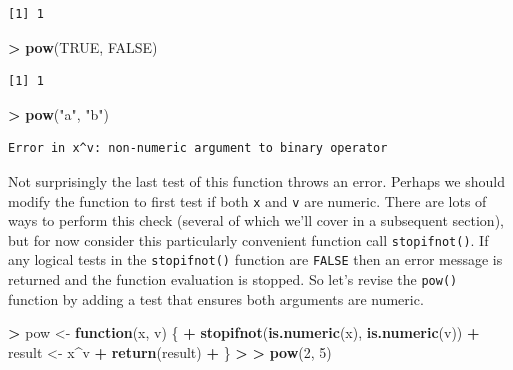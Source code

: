 \documentclass[]{krantz}
\makeatletter
\newenvironment{Shaded}{\begin{snugshade}}{\end{snugshade}}
\newcommand{\ControlFlowTok}[1]{\textcolor[rgb]{0.27,0.27,0.27}{\textbf{#1}}}
\newcommand{\DecValTok}[1]{\textcolor[rgb]{0.06,0.06,0.06}{#1}}
\newcommand{\ErrorTok}[1]{\textcolor[rgb]{0.14,0.14,0.14}{\textbf{#1}}}
\newcommand{\KeywordTok}[1]{\textcolor[rgb]{0.27,0.27,0.27}{\textbf{#1}}}
\newcommand{\NormalTok}[1]{#1}
\newcommand{\OperatorTok}[1]{\textcolor[rgb]{0.43,0.43,0.43}{\textbf{#1}}}
\newcommand{\OtherTok}[1]{\textcolor[rgb]{0.37,0.37,0.37}{#1}}
\newcommand{\StringTok}[1]{\textcolor[rgb]{0.5,0.5,0.5}{#1}}
\newenvironment{kframe}{%
\medskip{}
\setlength{\fboxsep}{.8em}
 \def\at@end@of@kframe{}%
 \ifinner\ifhmode%
  \def\at@end@of@kframe{\end{minipage}}%
  \begin{minipage}{\columnwidth}%
 \fi\fi%
 \def\FrameCommand##1{\hskip\@totalleftmargin \hskip-\fboxsep
 \colorbox{shadecolor}{##1}\hskip-\fboxsep
     \hskip-\linewidth \hskip-\@totalleftmargin \hskip\columnwidth}%
 \MakeFramed {\advance\hsize-\width
   \@totalleftmargin\z@ \linewidth\hsize
   \@setminipage}}%
 {\par\unskip\endMakeFramed%
 \at@end@of@kframe}
\renewenvironment{Shaded}{\begin{kframe}}{\end{kframe}}
\makeatother
\begin{document}
\begin{verbatim}
[1] 1
\end{verbatim}

\begin{Shaded}
\begin{Highlighting}[]
\OperatorTok{>}\StringTok{ }\KeywordTok{pow}\NormalTok{(}\OtherTok{TRUE}\NormalTok{, }\OtherTok{FALSE}\NormalTok{)}
\end{Highlighting}
\end{Shaded}

\begin{verbatim}
[1] 1
\end{verbatim}

\begin{Shaded}
\begin{Highlighting}[]
\OperatorTok{>}\StringTok{ }\KeywordTok{pow}\NormalTok{(}\StringTok{"a"}\NormalTok{, }\StringTok{"b"}\NormalTok{)}
\end{Highlighting}
\end{Shaded}

\begin{verbatim}
Error in x^v: non-numeric argument to binary operator
\end{verbatim}

Not surprisingly the last test of this function throws an error. Perhaps we should modify the function to first test if both \texttt{x} and \texttt{v} are numeric. There are lots of ways to perform this check (several of which we'll cover in a subsequent section), but for now consider this particularly convenient function call \texttt{stopifnot()}. If any logical tests in the \texttt{stopifnot()} function are \texttt{FALSE} then an error message is returned and the function evaluation is stopped. So let's revise the \texttt{pow()} function by adding a test that ensures both arguments are numeric.

\begin{Shaded}
\begin{Highlighting}[]
\OperatorTok{>}\StringTok{ }\NormalTok{pow <-}\StringTok{ }\ControlFlowTok{function}\NormalTok{(x, v) \{}
\OperatorTok{+}\StringTok{   }\KeywordTok{stopifnot}\NormalTok{(}\KeywordTok{is.numeric}\NormalTok{(x), }\KeywordTok{is.numeric}\NormalTok{(v))}
\OperatorTok{+}\StringTok{   }\NormalTok{result <-}\StringTok{ }\NormalTok{x}\OperatorTok{^}\NormalTok{v}
\OperatorTok{+}\StringTok{   }\KeywordTok{return}\NormalTok{(result)}
\OperatorTok{+}\StringTok{ }\NormalTok{\}}
\OperatorTok{>}\StringTok{ }
\ErrorTok{>}\StringTok{ }\KeywordTok{pow}\NormalTok{(}\DecValTok{2}\NormalTok{, }\DecValTok{5}\NormalTok{)}
\end{Highlighting}
\end{Shaded}
\end{document}
